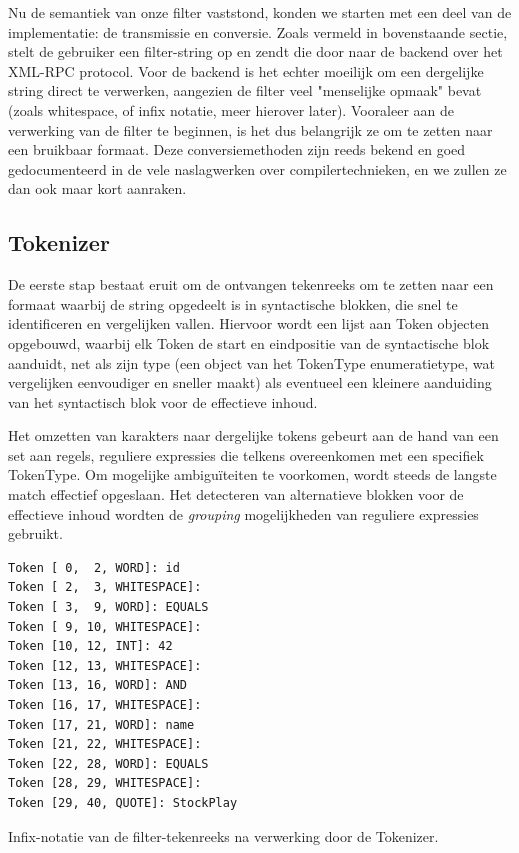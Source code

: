 Nu de semantiek van onze filter vaststond, konden we starten met een deel van de implementatie: de transmissie en conversie.
Zoals vermeld in bovenstaande sectie, stelt de gebruiker een filter-string op en zendt die door naar de backend over het XML-RPC protocol. Voor de backend is het echter moeilijk om een dergelijke string direct te verwerken, aangezien de filter veel "menselijke opmaak" bevat (zoals whitespace, of infix notatie, meer hierover later). Vooraleer aan de verwerking van de filter te beginnen, is het dus belangrijk ze om te zetten naar een bruikbaar formaat.
Deze conversiemethoden zijn reeds bekend en goed gedocumenteerd in de vele naslagwerken over compilertechnieken, en we zullen ze dan ook maar kort aanraken.

\subsection{Tokenizer}

De eerste stap bestaat eruit om de ontvangen tekenreeks om te zetten naar een formaat waarbij de string opgedeelt is in syntactische blokken, die snel te identificeren en vergelijken vallen. Hiervoor wordt een lijst aan Token objecten opgebouwd, waarbij elk Token de start en eindpositie van de syntactische blok aanduidt, net als zijn type (een object van het TokenType enumeratietype, wat vergelijken eenvoudiger en sneller maakt) als eventueel een kleinere aanduiding van het syntactisch blok voor de effectieve inhoud.

Het omzetten van karakters naar dergelijke tokens gebeurt aan de hand van een set aan regels, reguliere expressies die telkens overeenkomen met een specifiek TokenType. Om mogelijke ambigu\"iteiten te voorkomen, wordt steeds de langste match effectief opgeslaan. Het detecteren van alternatieve blokken voor de effectieve inhoud wordten de \emph{grouping} mogelijkheden van reguliere expressies gebruikt.

\begin{code}
\begin{verbatim}
Token [ 0,  2, WORD]: id
Token [ 2,  3, WHITESPACE]:  
Token [ 3,  9, WORD]: EQUALS
Token [ 9, 10, WHITESPACE]:  
Token [10, 12, INT]: 42
Token [12, 13, WHITESPACE]:  
Token [13, 16, WORD]: AND
Token [16, 17, WHITESPACE]:  
Token [17, 21, WORD]: name
Token [21, 22, WHITESPACE]:  
Token [22, 28, WORD]: EQUALS
Token [28, 29, WHITESPACE]:  
Token [29, 40, QUOTE]: StockPlay
\end{verbatim}
\caption{Infix-notatie van de filter-tekenreeks na verwerking door de Tokenizer.}
\end{code}

